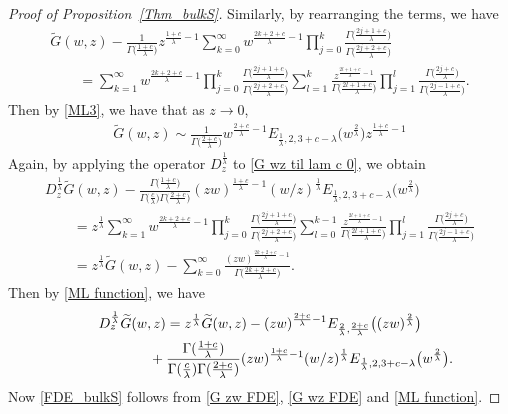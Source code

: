 \documentclass[pdftex]{sigma}
\numberwithin{equation}{section}
\newcommand{\1}{\chi}
\begin{document}
\begin{proof}[Proof of Proposition~\ref{Thm_bulkS}]
	Similarly, by rearranging the terms, we have
	\begin{gather}
 \widetilde{G}(w,z)-\frac{ 1 }{\Gamma\big( \frac{1+c}{\lambda}\big)} z^{ \frac{1+c}{\lambda}-1 } \sum_{k=0}^{\infty} w^{ \frac{2k+2+c}{\lambda}-1 } \prod_{j=0}^k \frac{ \Gamma\big( \frac{2j+1+c}{\lambda} \big) }{\Gamma\big( \frac{2j+2+c}{\lambda} \big)}
			\nonumber\\
\qquad{} =\sum_{k=1}^{\infty} w^{ \frac{2k+2+c}{\lambda}-1 } \prod_{j=0}^k \frac{ \Gamma\big( \frac{2j+1+c}{\lambda} \big) }{\Gamma\big( \frac{2j+2+c}{\lambda} \big)} \sum_{l=1}^{k} \frac{ z^{ \frac{2l+1+c}{\lambda}-1 } }{\Gamma\big( \frac{2l+1+c}{\lambda} \big)} \prod_{j=1}^l \frac{\Gamma\big(\frac{2j+c}{\lambda}\big) }{ \Gamma\big( \frac{2j-1+c}{\lambda} \big) } .\label{G wz til lam c 0}
		\end{gather}
	Then by \eqref{ML3}, we have that as $z\to 0$,
	\begin{gather*} %
		\widetilde{G}(w,z)\sim \frac{1 }{ \Gamma\big( \frac{2+c}{\lambda}\big) } w^{ \frac{2+c}{\lambda}-1 } E_{\frac{1}{\lambda},2,3+c-\lambda}\big(w^{\frac{2}{\lambda}}\big) z^{ \frac{1+c}{\lambda}-1 }
	\end{gather*}
	Again, by applying the operator $D_z^{ \frac{1}{\lambda} }$ to \eqref{G wz til lam c 0}, we obtain
	\begin{gather*}
D_z^{ \frac{1}{\lambda} } \widetilde{G}(w,z)-\frac{ \Gamma\big(\frac{1+c}{\lambda}\big) }{\Gamma\big( \frac{c}{\lambda}\big) \Gamma\big( \frac{2+c}{\lambda}\big) } (zw)^{ \frac{1+c}{\lambda}-1 }(w/z)^{\frac{1}{\lambda}} E_{\frac{1}{\lambda},2,3+c-\lambda}\big(w^{\frac{2}{\lambda}}\big)\\
\qquad{} = z^{ \frac{1}{\lambda} } \sum_{k=1}^{\infty} w^{ \frac{2k+2+c}{\lambda}-1 } \prod_{j=0}^k \frac{ \Gamma\big( \frac{2j+1+c}{\lambda} \big) }{\Gamma\big( \frac{2j+2+c}{\lambda} \big)} \sum_{l=0}^{k-1} \frac{ z^{ \frac{2l+1+c}{\lambda}-1 } }{\Gamma\big( \frac{2l+1+c}{\lambda} \big)} \prod_{j=1}^l \frac{\Gamma\big(\frac{2j+c}{\lambda}\big) }{ \Gamma\big( \frac{2j-1+c}{\lambda} \big) }
		\\
\qquad{} = z^{ \frac{1}{\lambda} } \widetilde{G}(w,z)- \sum_{k=0}^{\infty} \frac{(zw)^{ \frac{2k+2+c}{\lambda}-1 }}{\Gamma\big( \frac{2k+2+c}{\lambda} \big)}.
	\end{gather*}
	Then by \eqref{ML function}, we have
	\begin{gather}
D_z^{ \frac{1}{\lambda} } \widetilde{G}(w,z)= z^{ \frac{1}{\lambda} } \widetilde{G}(w,z) -(zw)^{\frac{2+c}{\lambda}-1} E_{\frac{2}{\lambda},\frac{2+c}{\lambda}} \big((zw)^{\frac{2}{\lambda}}\big) \nonumber\\
\hphantom{D_z^{ \frac{1}{\lambda} } \widetilde{G}(w,z)=}{}
+\frac{ \Gamma(\frac{1+c}{\lambda}) }{\Gamma( \frac{c}{\lambda}) \Gamma( \frac{2+c}{\lambda}) } (zw)^{ \frac{1+c}{\lambda}-1 }(w/z)^{\frac{1}{\lambda}} E_{\frac{1}{\lambda},2,3+c-\lambda}\big(w^{\frac{2}{\lambda}}\big) . \label{G wz FDE}
		\end{gather}
	Now \eqref{FDE_bulkS} follows from \eqref{G zw FDE}, \eqref{G wz FDE} and \eqref{ML function}.
\end{proof}
\end{document}
